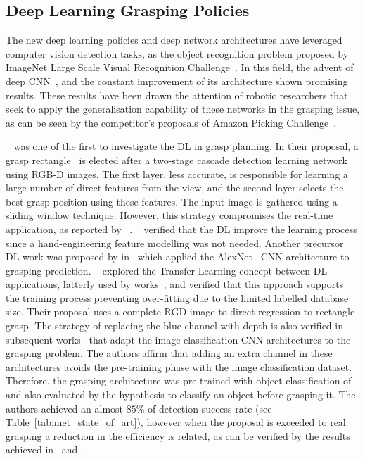 
\subsection{Deep Learning Grasping Policies}
\label{cap2:related_work:sec:grasping_approaches:subsec:deep_learning_review}


The new deep learning policies and deep network architectures have leveraged computer vision detection tasks, as the object recognition problem proposed by ImageNet Large Scale Visual Recognition Challenge~\cite{imagenet_challenge}. In this field, the advent of deep \ac{CNN}~\cite{krizhevsky2012imagenet}, and the constant improvement of its architecture shown promising results. These results have been drawn the attention of robotic researchers that seek to apply the generalisation capability of these networks in the grasping issue, as can be seen by the competitor's proposals of Amazon Picking Challenge~\cite{amazon_challenge}.

\citeauthor{Lenz2015}~\cite{Lenz2015} was one of the first to investigate the \ac{DL} in grasp planning. In their proposal, a grasp rectangle~\cite{Jiang2011a} is elected after a two-stage cascade detection learning network using RGB-D images. The first layer, less accurate, is responsible for learning a large number of direct features from the view, and the second layer selects the best grasp position using these features. The input image is gathered using a sliding window technique. However, this strategy compromises the real-time application, as reported by
~\cite{Redmon2015, Guo2017,Chu2018}. \citeauthor{Lenz2015}~\cite{Lenz2015} verified that the \ac{DL} improve the learning process since a hand-engineering feature modelling was not needed. Another precursor \ac{DL} work was proposed by \citeauthor{Redmon2015} in~\cite{Redmon2015} which applied the AlexNet~\cite{krizhevsky2012imagenet} \ac{CNN} architecture to grasping prediction.  \citeauthor{Redmon2015}~\cite{Redmon2015} explored the Transfer Learning concept between \ac{DL} applications, latterly used by works~\cite{Kumra2017,TenPas2017, Chen2019,Mahler2017d,Zeng2019,Chen2020}, and verified that this approach supports the training process preventing over-fitting due to the limited labelled database size. Their proposal uses a complete RGD image to direct regression to rectangle grasp. The strategy of replacing the blue channel with depth is also verified in subsequent works~\cite{Kumra2017,Chen2019,song2020novel} that adapt the image classification \ac{CNN} architectures to the grasping problem. The authors affirm that adding an extra channel in these architectures avoids the pre-training phase with the image classification dataset. Therefore, the grasping architecture was pre-trained with object classification of~\cite{imagenet_challenge} and also evaluated by the hypothesis to classify an object before grasping it. The authors achieved an almost $85\%$ of detection success rate (see Table~\ref{tab:met_state_of_art}), however when the proposal is exceeded to real grasping a reduction in the efficiency is related, as can be verified by the results achieved in~\cite{Watson2017} and~\cite{Chu2018}.

